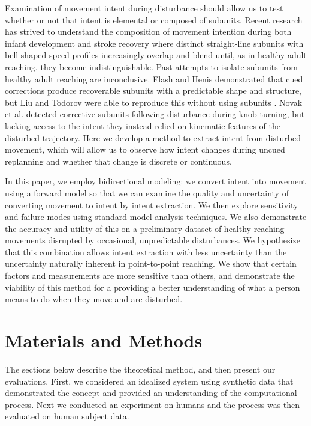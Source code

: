 \documentclass[10pt]{article}
\begin{document}
Examination of movement intent during disturbance should allow us to test whether or not that intent is elemental or composed of subunits. Recent research has strived to understand the composition of movement intention during both infant development\cite{von1979observations} and stroke recovery\cite{rohrer2004submovements} where distinct straight-line subunits with bell-shaped speed profiles increasingly overlap and blend until, as in healthy adult reaching\cite{woodworth1899accuracy}, they become indistinguishable. Past attempts to isolate subunits from healthy adult reaching are inconclusive. Flash and Henis \cite{flash1991arm} demonstrated that  cued corrections produce recoverable subunits with a predictable shape and structure, but Liu and Todorov were able to reproduce this without using subunits \cite{liu2007evidence}. Novak et al. \cite{novak2002use} detected corrective subunits following disturbance during knob turning, but lacking access to the intent they instead relied on kinematic features of the disturbed trajectory. Here we develop a method to extract intent from disturbed movement, which will allow us to observe how intent changes during uncued replanning and whether that change is discrete or continuous. 

In this paper, we employ bidirectional modeling: we convert intent into movement using a forward model so that we can examine the quality and uncertainty of converting movement to intent by intent extraction. We then explore sensitivity and failure modes using standard model analysis techniques. We also demonstrate the accuracy and utility of this on a preliminary dataset of healthy reaching movements disrupted by occasional, unpredictable disturbances. We hypothesize that this combination allows intent extraction with less uncertainty than the uncertainty naturally inherent in point-to-point reaching. We show that certain factors and measurements are more sensitive than others, and demonstrate the viability of this method for a providing a better understanding of what a person means to do when they move and are disturbed.


\section*{Materials and Methods}
The sections below describe the theoretical method, and then present our evaluations. First, we considered an idealized system using synthetic data that demonstrated the concept and provided an understanding of the computational process. Next we conducted an experiment on humans and the process was then evaluated on human subject data. 
\end{document}
